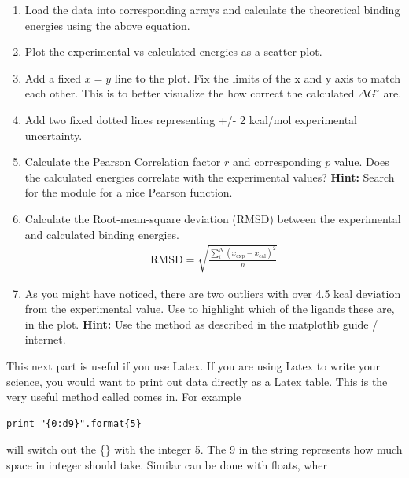 \documentclass{article}
\begin{document}
\begin{enumerate}

    \item Load the data into corresponding arrays and calculate the theoretical binding energies using the above equation.

    \item Plot the experimental vs calculated energies as a scatter plot.

    \item Add a fixed $x = y$ line to the plot.
        Fix the limits of the x and y axis to match each other.
        This is to better visualize the how correct the calculated $\Delta G^\circ$ are.

    \item Add two fixed dotted lines representing +/- 2 kcal/mol experimental uncertainty. 

    \item Calculate the Pearson Correlation factor $r$ and corresponding $p$ value.
        Does the calculated energies correlate with the experimental values?
        {\bf Hint:} Search for the  module for a nice Pearson function.

    \item Calculate the Root-mean-square deviation (RMSD) between the experimental and calculated binding energies.
    \begin{align}
        \mathrm{RMSD} = \sqrt{\frac{\sum_i^N (x_{\mathrm{exp}}-x_{\mathrm{cal}})^2 }{n}}
    \end{align}

    \item As you might have noticed, there are two outliers with over 4.5 kcal deviation from the experimental value.
        Use  to highlight which of the ligands these are, in the plot.
        {\bf Hint:} Use the method  as described in the matplotlib guide / internet.

\end{enumerate}

\newpage
This next part is useful if you use Latex.
If you are using Latex to write your science, you would want to print out data directly as a Latex table.
This is the very useful method called  comes in.
For example

\begin{lstlisting}
print "{0:d9}".format{5}
\end{lstlisting}

will switch out the \{\} with the integer 5.
The 9 in the string represents how much space in integer should take.
Similar can be done with floats, wher
\end{document}
